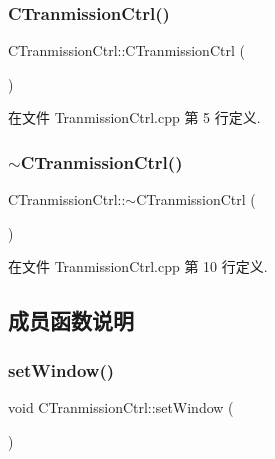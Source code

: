 \subsubsection{\texorpdfstring{C\+Tranmission\+Ctrl()}{CTranmissionCtrl()}}
{\footnotesize\ttfamily C\+Tranmission\+Ctrl\+::\+C\+Tranmission\+Ctrl (\begin{DoxyParamCaption}{ }\end{DoxyParamCaption})}



在文件 Tranmission\+Ctrl.\+cpp 第 5 行定义.

\mbox{\label{class_c_tranmission_ctrl_a5dde68acc83557c551c449db31fb23dc}} 
\subsubsection{\texorpdfstring{$\sim$\+C\+Tranmission\+Ctrl()}{~CTranmissionCtrl()}}
{\footnotesize\ttfamily C\+Tranmission\+Ctrl\+::$\sim$\+C\+Tranmission\+Ctrl (\begin{DoxyParamCaption}{ }\end{DoxyParamCaption})}



在文件 Tranmission\+Ctrl.\+cpp 第 10 行定义.



\subsection{成员函数说明}
\mbox{\label{class_c_tranmission_ctrl_a788cf64847e7345d6f82080a539431eb}} 
\subsubsection{\texorpdfstring{set\+Window()}{setWindow()}}
{\footnotesize\ttfamily void C\+Tranmission\+Ctrl\+::set\+Window (\begin{DoxyParamCaption}{ }\end{DoxyParamCaption})}



